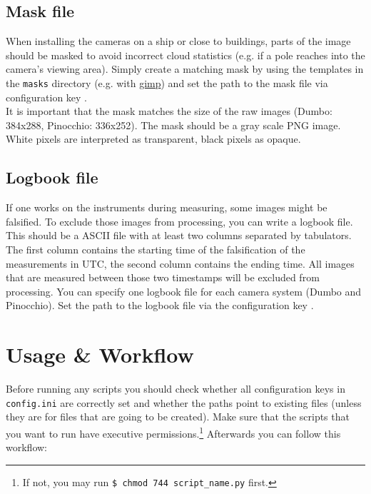 \documentclass[11pt,a4paper]{article}
\begin{document}
\subsection{Mask file}
When installing the cameras on a ship or close to buildings, parts of the image should be masked to avoid incorrect cloud statistics (e.g. if a pole reaches into the camera's viewing area). Simply create a matching mask by using the templates in the \texttt{masks} directory (e.g. with \href{https://www.gimp.org}{gimp}) and set the path to the mask file via configuration key .\\
It is important that the mask matches the size of the raw images (Dumbo: 384x288, Pinocchio: 336x252). The mask should be a gray scale PNG image. White pixels are interpreted as transparent, black pixels as opaque.

\subsection{Logbook file}
If one works on the instruments during measuring, some images might be falsified. To exclude those images from processing, you can write a logbook file. This should be a ASCII file with at least two columns separated by tabulators. The first column contains the starting time of the falsification of the measurements in UTC, the second column contains the ending time. All images that are measured between those two timestamps will be excluded from processing. You can specify one logbook file for each camera system (Dumbo and Pinocchio). Set the path to the logbook file via the configuration key .\\

\section{Usage \& Workflow}
\label{sec:usage-workflow}
Before running any scripts you should check whether all configuration keys in \texttt{config.ini} are correctly set and whether the paths point to existing files (unless they are for files that are going to be created). Make sure that the scripts that you want to run have executive permissions.\footnote{If not, you may run \texttt{\$ chmod 744 script\_name.py} first.} Afterwards you can follow this workflow:
\end{document}
